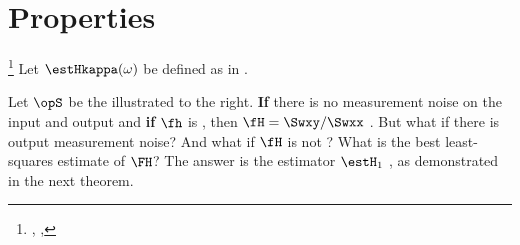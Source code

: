 \section{Properties}
\begin{proposition}
\footnote{
  ,
  ,
  }
\label{prop:Hkappa}
Let $\estHkappa(\omega)$ be defined as in .
\end{proposition}

\begin{minipage}{\tw-50mm}
Let $\opS$ be the  illustrated to the right.
\textbf{If} there is no measurement noise on the input and output and \textbf{if}
$\fh$ is , then
$\fH = \Swxy/\Swxx$ .
But what if there is output measurement noise?
And what if $\fH$ is not ?
What is the best least-squares estimate of $\FH$?
The answer is the estimator $\estH_1$ ,
as demonstrated in the next theorem.
\end{minipage}
\hfill{}

